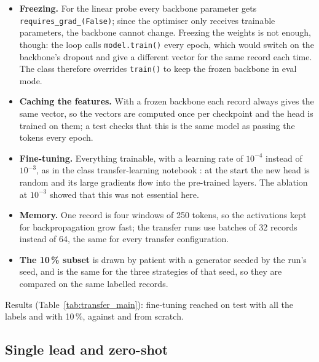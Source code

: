 \begin{itemize}[leftmargin=1.2em,itemsep=1pt]
  \item \textbf{Freezing.} For the linear probe every backbone parameter gets \texttt{requires\_grad\_(False)};
        since the optimiser only receives trainable parameters, the backbone cannot change.
        Freezing the weights is not enough, though: the loop calls \texttt{model.train()} every epoch, which
        would switch on the backbone's dropout and give a different vector for the same record each time.
        The class therefore overrides \texttt{train()} to keep the frozen backbone in eval mode.
  \item \textbf{Caching the features.} With a frozen backbone each record always gives the same vector, so
        the vectors are computed once per checkpoint and the head is trained on them; a test checks that this
        is the same model as passing the tokens every epoch.
  \item \textbf{Fine-tuning.} Everything trainable, with a learning rate of $10^{-4}$ instead of $10^{-3}$, as in
        the class transfer-learning notebook \cite{course_nb_transfer}: at the start the new head is random and
        its large gradients flow into the pre-trained layers. The ablation at $10^{-3}$ showed that this was
        not essential here.
  \item \textbf{Memory.} One record is four windows of 250 tokens, so the activations kept for
        backpropagation grow fast; the transfer runs use batches of 32 records instead of 64, the same for
        every transfer configuration.
  \item \textbf{The 10\,\% subset} is drawn by patient with a generator seeded by the run's seed, and is the
        same for the three strategies of that seed, so they are compared on the same labelled records.
\end{itemize}
Results (Table~\ref{tab:transfer_main}): fine-tuning reached
\transferTestAurocMeanFinetuneFOneZeroZero{} on test with all the labels and
\transferTestAurocMeanFinetuneFOneZero{} with 10\,\%, against \transferTestAurocMeanScratchFOneZeroZero{}
and \transferTestAurocMeanScratchFOneZero{} from scratch.



\subsection{Single lead and zero-shot}


